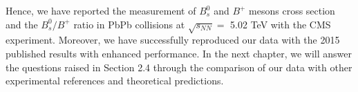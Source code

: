 Hence, we have reported the measurement of $B^0_s$ and $B^+$ mesons cross section and the $B^0_s/B^+$ ratio in PbPb collisions at $\sqrt{s_{NN}} =$ 5.02 TeV with the CMS experiment. Moreover, we have successfully reproduced our data with the 2015 published results with enhanced performance. In the next chapter, we will answer the questions raised in Section 2.4 through the comparison of our data with other experimental references and theoretical predictions. 



